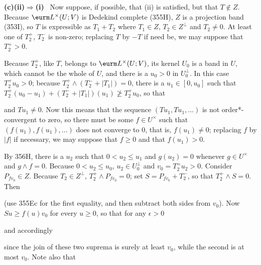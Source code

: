 {{\bf (c)(ii)$\Rightarrow$(i)} \Quer\ Now suppose, if possible, that (ii)
is satisfied, but that $T\notin Z$.   Because $\eurm L^{\times}(U;V)$ is
Dedekind complete (355H), $Z$ is a projection band (353I), so $T$ is
expressible as
$T_1+T_2$ where $T_1\in Z$, $T_2\in Z^{\perp}$ and $T_2\ne 0$.   At
least one of $T_2^+$, $T_2^-$ is non-zero;  replacing $T$ by $-T$ if
need be, we may suppose that $T_2^+>0$.

Because $T_2^+$, like $T$, belongs to $\eurm L^{\times}(U;V)$, its
kernel $U_0$ is a band in $U$, which cannot be the whole of $U$, and
there is a $u_0>0$ in $U_0^{\perp}$.   In this case $T_2^+u_0>0$;
because $T_2^+\wedge(T_2^-+|T_1|)=0$, there is a $u_1\in[0,u_0]$ such
that $T_2^+(u_0-u_1)+(T_2^-+|T_1|)(u_1)\not\ge T_2^+u_0$, so that


\noindent and $Tu_1\ne 0$.   Now this means that the sequence
$(Tu_1,Tu_1,\ldots)$ is not order*-convergent to zero, so there must
be some $f\in U^{\times}$ such that $(f(u_1),f(u_1),\ldots)$ does not
converge to $0$, that is, $f(u_1)\ne 0$;  replacing $f$ by $|f|$ if
necessary, we may suppose that $f\ge 0$ and that $f(u_1)>0$.

By 356H, there is a $u_2$ such that $0<u_2\le u_1$ and $g(u_2)=0$
whenever $g\in U^{\times}$ and $g\wedge f=0$.
Because $0<u_2\le u_0$, $u_2\in U_0^{\perp}$ and $v_0=T_2^+u_2>0$.
Consider $P_{fv_0}\in Z$.   Because $T_2\in Z^{\perp}$, $T_2^+\wedge
P_{fv_0}=0$;  set $S=P_{fv_0}+T_2^-$, so that $T_2^+\wedge S=0$.   Then


\noindent (use 355Ec for the first equality, and then subtract both
sides from $v_0$).   Now $Su\ge f(u)v_0$ for every $u\ge 0$, so that for
any $\epsilon>0$


\noindent and accordingly


\noindent since the join of these two suprema is surely at least $v_0$,
while the second is at most $v_0$.
Note also that


}
